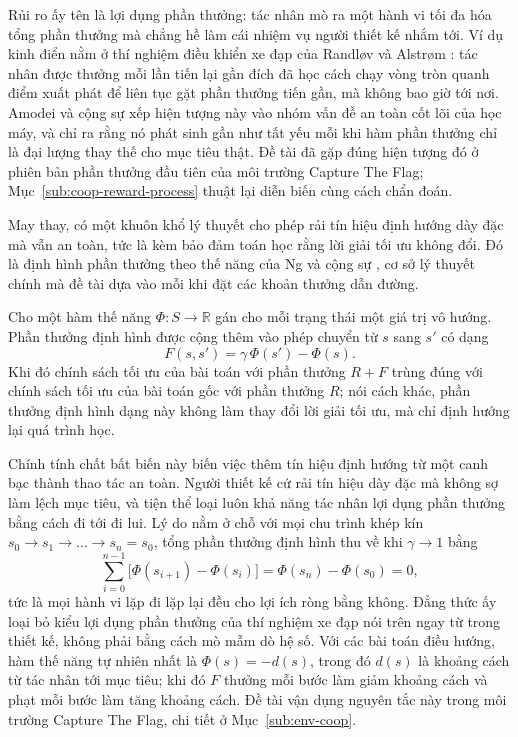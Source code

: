 \indent Rủi ro ấy tên là lợi dụng phần thưởng: tác nhân mò ra một hành vi tối đa hóa tổng
phần thưởng mà chẳng hề làm cái nhiệm vụ người thiết kế nhắm tới. Ví dụ kinh điển nằm ở
thí nghiệm điều khiển xe đạp của Randløv và Alstrøm \cite{randlov1998learning}: tác nhân
được thưởng mỗi lần tiến lại gần đích đã học cách chạy vòng tròn quanh điểm xuất phát để
liên tục gặt phần thưởng tiến gần, mà không bao giờ tới nơi. Amodei và cộng sự
\cite{amodei2016concrete} xếp hiện tượng này vào nhóm vấn đề an toàn cốt lõi của học máy,
và chỉ ra rằng nó phát sinh gần như tất yếu mỗi khi hàm phần thưởng chỉ là đại lượng thay
thế cho mục tiêu thật. Đề tài đã gặp đúng hiện tượng đó ở phiên bản phần thưởng đầu tiên
của môi trường Capture The Flag; Mục~\ref{sub:coop-reward-process} thuật lại diễn biến
cùng cách chẩn đoán.

\indent May thay, có một khuôn khổ lý thuyết cho phép rải tín hiệu định hướng dày đặc mà
vẫn an toàn, tức là kèm bảo đảm toán học rằng lời giải tối ưu không đổi. Đó là định hình
phần thưởng theo thế năng của Ng và cộng sự \cite{ng1999policy}, cơ sở lý thuyết chính mà
đề tài dựa vào mỗi khi đặt các khoản thưởng dẫn đường.

\begin{dn}
\label{dn:pbrs}
Cho một hàm thế năng $\Phi: S \to \mathbb{R}$ gán cho mỗi trạng thái một giá trị vô
hướng. Phần thưởng định hình được cộng thêm vào phép chuyển từ $s$ sang $s'$ có dạng
\[
F(s, s') = \gamma\, \Phi(s') - \Phi(s).
\]
Khi đó chính sách tối ưu của bài toán với phần thưởng $R + F$ trùng đúng với chính sách
tối ưu của bài toán gốc với phần thưởng $R$; nói cách khác, phần thưởng định hình dạng
này không làm thay đổi lời giải tối ưu, mà chỉ định hướng lại quá trình học.
\end{dn}

\indent Chính tính chất bất biến này biến việc thêm tín hiệu định hướng từ một canh bạc
thành thao tác an toàn. Người thiết kế cứ rải tín hiệu dày đặc mà không sợ làm lệch mục
tiêu, và tiện thể loại luôn khả năng tác nhân lợi dụng phần thưởng bằng cách đi tới đi
lui. Lý do nằm ở chỗ với mọi chu trình khép kín $s_0 \to s_1 \to \dots \to s_n = s_0$,
tổng phần thưởng định hình thu về khi $\gamma \to 1$ bằng
\begin{equation}
\sum_{i=0}^{n-1} \bigl[\Phi(s_{i+1}) - \Phi(s_i)\bigr] = \Phi(s_n) - \Phi(s_0) = 0 ,
\label{eq:pbrs-cycle}
\end{equation}
tức là mọi hành vi lặp đi lặp lại đều cho lợi ích ròng bằng không. Đẳng thức ấy loại bỏ
kiểu lợi dụng phần thưởng của thí nghiệm xe đạp nói trên ngay từ trong thiết kế, không
phải bằng cách mò mẫm dò hệ số. Với các bài toán điều hướng, hàm thế năng tự nhiên nhất là
$\Phi(s) = -d(s)$, trong đó $d(s)$ là khoảng cách từ tác nhân tới mục tiêu; khi đó $F$
thưởng mỗi bước làm giảm khoảng cách và phạt mỗi bước làm tăng khoảng cách. Đề tài vận
dụng nguyên tắc này trong môi trường Capture The Flag, chi tiết ở
Mục~\ref{sub:env-coop}.

